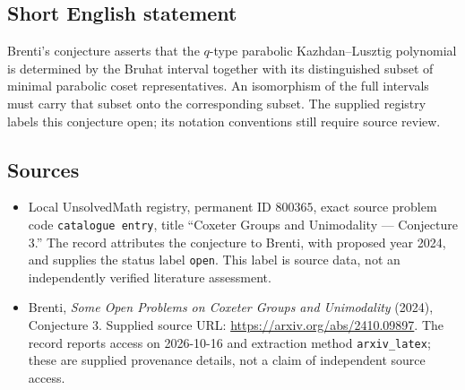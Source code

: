 \documentclass[11pt]{article}
\begin{document}
\subsection{Short English statement}
Brenti's conjecture asserts that the \(q\)-type parabolic Kazhdan--Lusztig polynomial is determined by the Bruhat interval together with its distinguished subset of minimal parabolic coset representatives. An isomorphism of the full intervals must carry that subset onto the corresponding subset. The supplied registry labels this conjecture open; its notation conventions still require source review.
\subsection{Sources}
\begin{itemize}
\item Local UnsolvedMath registry, permanent ID \(800365\), exact source problem code \texttt{catalogue entry}, title ``Coxeter Groups and Unimodality --- Conjecture 3.'' The record attributes the conjecture to Brenti, with proposed year 2024, and supplies the status label \texttt{open}. This label is source data, not an independently verified literature assessment.
\item Brenti, \emph{Some Open Problems on Coxeter Groups and Unimodality} (2024), Conjecture 3. Supplied source URL: \url{https://arxiv.org/abs/2410.09897}. The record reports access on 2026-10-16 and extraction method \texttt{arxiv\_latex}; these are supplied provenance details, not a claim of independent source access.
\end{itemize}
\end{document}
